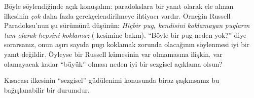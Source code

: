 \documentclass[../../../include/open-logic-section]{subfiles}
\begin{document}
Böyle söylendiğinde açık konuşalım: paradokslara bir yanıt olarak ele alınan
\limofsize{} ilkesinin \emph{çok} daha fazla gerekçelendirilmeye ihtiyacı
vardır. Örneğin Russell Paradoksu'nun şu sürümünü düşünün: \emph{Hiçbir pug,
kendisini koklamayan pugların tam olarak hepsini koklamaz}
( kesimine bakın). ``Böyle bir pug neden yok?''
diye sorarsanız, onun aşırı sayıda pugı koklamak zorunda olacağının söylenmesi
iyi bir yanıt değildir. Öyleyse bir Russell kümesinin var olmamasına ilişkin,
var olamayacak kadar ``büyük'' olması neden iyi bir sezgisel açıklama olsun?

Kısacası \limofsize{} ilkesinin ``sezgisel'' güdülenimi konusunda biraz
şaşkınsanız bu bağışlanabilir bir durumdur.
\end{document}
